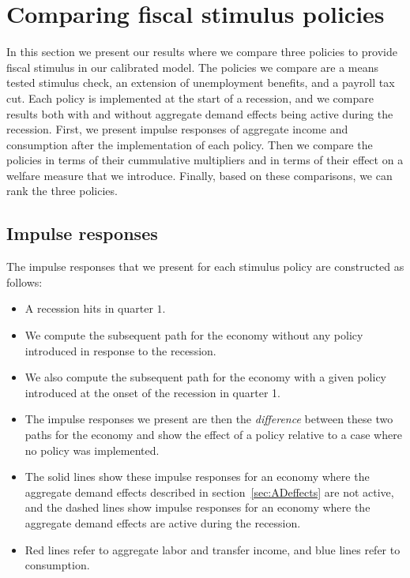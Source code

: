 \documentclass[../HAFiscal]{subfiles}
\begin{document}
	
\FloatBarrier
\section{Comparing fiscal stimulus policies}
\label{sec:comparing}

In this section we present our results where we compare three policies to provide fiscal stimulus in our calibrated model. The policies we compare are a means tested stimulus check, an extension of unemployment benefits, and a payroll tax cut. Each policy is implemented at the start of a recession, and we compare results both with and without aggregate demand effects being active during the recession. First, we present impulse responses of aggregate income and consumption after the implementation of each policy. Then we compare the policies in terms of their cummulative multipliers and in terms of their effect on a welfare measure that we introduce. Finally, based on these comparisons, we can rank the three policies. 

\subsection{Impulse responses}
\label{sec:IRFs}

The impulse responses that we present for each stimulus policy are constructed as follows: 
\begin{itemize} 
	\item A recession hits in quarter $1$. 
	\item We compute the subsequent path for the economy without any policy introduced in response to the recession. 
	\item We also compute the subsequent path for the economy with a given policy introduced at the onset of the recession in quarter 1. 
	\item The impulse responses we present are then the \textit{difference} between these two paths for the economy and show the effect of a policy relative to a case where no policy was implemented.
	\item The solid lines show these impulse responses for an economy where the aggregate demand effects described in section~\ref{sec:ADeffects} are not active, and the dashed lines show impulse responses for an economy where the aggregate demand effects are active during the recession. 
	\item Red lines refer to aggregate labor and transfer income, and blue lines refer to consumption. 
\end{itemize}
\end{document}
